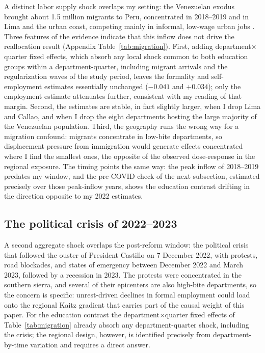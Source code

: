 A distinct labor supply shock overlaps my setting: the Venezuelan exodus brought about 1.5 million migrants to Peru, concentrated in 2018--2019 and in Lima and the urban coast, competing mainly in informal, low-wage urban jobs \citep{asencios_castellares_2020}. Three features of the evidence indicate that this inflow does not drive the reallocation result (Appendix Table~\ref{tab:migration}). First, adding department$\times$quarter fixed effects, which absorb any local shock common to both education groups within a department-quarter, including migrant arrivals and the regularization waves of the study period, leaves the formality and self-employment estimates essentially unchanged ($-0.041$ and $+0.034$); only the employment estimate attenuates further, consistent with my reading of that margin. Second, the estimates are stable, in fact slightly larger, when I drop Lima and Callao, and when I drop the eight departments hosting the large majority of the Venezuelan population. Third, the geography runs the wrong way for a migration confound: migrants concentrate in low-bite departments, so displacement pressure from immigration would generate effects concentrated where I find the smallest ones, the opposite of the observed dose-response in the regional exposure. The timing points the same way: the peak inflow of 2018--2019 predates my window, and the pre-COVID check of the next subsection, estimated precisely over those peak-inflow years, shows the education contrast drifting in the direction opposite to my 2022 estimates.

\subsection{The political crisis of 2022--2023}

A second aggregate shock overlaps the post-reform window: the political crisis that followed the ouster of President Castillo on 7 December 2022, with protests, road blockades, and states of emergency between December 2022 and March 2023, followed by a recession in 2023. The protests were concentrated in the southern sierra, and several of their epicenters are also high-bite departments, so the concern is specific: unrest-driven declines in formal employment could load onto the regional Kaitz gradient that carries part of the causal weight of this paper. For the education contrast the department$\times$quarter fixed effects of Table~\ref{tab:migration} already absorb any department-quarter shock, including the crisis; the regional design, however, is identified precisely from department-by-time variation and requires a direct answer.

